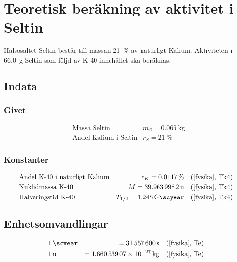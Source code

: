 \section{Teoretisk beräkning av aktivitet i Seltin} \label{sec:seltin}

Hälsosaltet Seltin består till massan \qty{21}{\percent} av naturligt Kalium.
Aktiviteten i \qty{66.0}{\g} Seltin som följd av K-40-innehållet ska beräknas.

\subsection*{Indata}

\subsubsection*{Givet}

\begin{align*}
    & \text{Massa Seltin}          & m_S = \qty{0.066}{\kg} \\
    & \text{Andel Kalium i Seltin} & r_S = \qty{21}{\percent}
\end{align*}

\subsubsection*{Konstanter}

\begin{align*}
    & \text{Andel K-40 i naturligt Kalium} & r_K     = \qty{0.0117}{\percent}     &\quad \text{(\cite{fysika}, Tk4)} \\
    & \text{Nuklidmassa K-40}              & M       = \qty{39.9639982}{\atomicmassunit}  &\quad \text{(\cite{fysika}, Tk4)} \\
    & \text{Halveringstid K-40}            & T_{1/2} = \qty{1.248}{\giga\scyear} &\quad \text{(\cite{fysika}, Tk4)}
\end{align*}

\subsection*{Enhetsomvandlingar}

\begin{align*}
    & \qty{1}{\scyear} &= \qty{31557600}{\s}         &\quad \text{(\cite{fysika}, Te)} \\
    & \qty{1}{\atomicmassunit} &= \qty{1.66053907e-27}{\kg} &\quad \text{(\cite{fysika}, Te)}
\end{align*}


